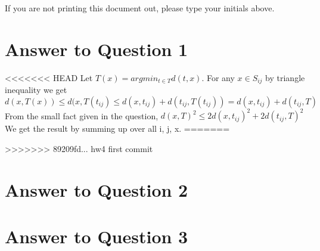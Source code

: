 \documentclass[11pt]{article}
\begin{document}
If you are not printing this document out, please type your initials above.

\vfill
\vfill


\pagebreak[4]
\section*{Answer to Question 1}
<<<<<<< HEAD
Let $T(x) = argmin_{t\in T}d(t,x)$. For any $x \in S_{ij}$ by triangle inequality we get 
$d(x, T(x)) \leq d(x, T(t_{ij}) \leq d(x, t_{ij}) + d(t_{ij}, T(t_{ij})) = d(x, t_{ij}) + d(t_{ij}, T)$ \\
From the small fact given in the question, $d(x,T)^2 \leq 2d(x, t_{ij})^2 + 2d(t_{ij},T)^2 $ \\
We get the result by summing up over all i, j, x.
=======

>>>>>>> 89209fd... hw4 first commit
\section*{Answer to Question 2}

\section*{Answer to Question 3}
\end{document}
